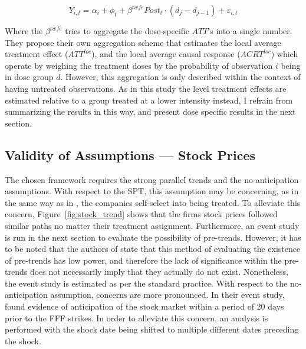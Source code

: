 \documentclass[12pt]{article}
\begin{document}
\begin{equation}
    Y_{i,t} = \alpha_i + \phi_t +  \beta^{twfe} Post_t \cdot (d_j - d_{j-1}) + \varepsilon_{i,t}
\end{equation}

Where the $\beta^{twfe}$ tries to aggregate the dose-specific $ATT$'s into a single number. They propose their own aggregation scheme that estimates the local average treatment effect ($ATT^{loc}$), and the local average causal response ($ACRT^{loc}$) which operate by weighing the treatment doses by the probability of observation $i$ being in dose group $d$. However, this aggregation is only described within the context of having untreated observations. As in this study the level treatment effects are estimated relative to a group treated at a lower intensity instead, I refrain from summarizing the results in this way, and present dose specific results in the next section.


\subsection{Validity of Assumptions --- Stock Prices}

The chosen framework requires the strong parallel trends and the no-anticipation assumptions. With respect to the SPT, this assumption may be concerning, as in the same way as in \textcite{koenigImpulsePurchasesGun2023}, the companies self-select into being treated. To alleviate this concern, Figure~\ref{fig:stock_trend} shows that the firms stock prices followed similar paths no matter their treatment assignment.
Furthermore, an event study is run in the next section to evaluate the possibility of pre-trends. However, it has to be noted that the authors of \textcite{callawayDifferenceinDifferencesContinuousTreatment2025} state that this method of evaluating the existence of pre-trends has low power, and therefore the lack of significance within the pre-trends does not necessarily imply that they actually do not exist. Nonetheless, the event study is estimated as per the standard practice.
With respect to the no-anticipation assumption, concerns are more pronounced. In their event study, \textcite{schusterStockPriceReactions2023} found evidence of anticipation of the stock market within a period of 20 days prior to the FFF strikes. In order to alleviate this concern, an analysis is performed with the shock date being shifted to multiple different dates preceding the shock.
\end{document}
